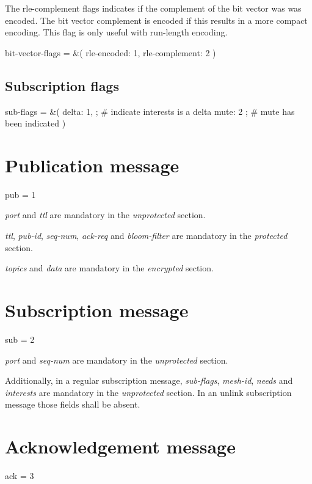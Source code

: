 The rle-\/complement flags indicates if the complement of the bit vector was was encoded. The bit vector complement is encoded if this results in a more compact encoding. This flag is only useful with run-\/length encoding.

\begin{DoxyVerb}bit-vector-flags = &(
  rle-encoded: 1,
  rle-complement: 2
)
\end{DoxyVerb}
\hypertarget{message-types-and-flow_subscription-flags}{}\subsection{Subscription flags}\label{message-types-and-flow_subscription-flags}
\begin{DoxyVerb}sub-flags = &(
  delta: 1,        ; # indicate interests is a delta
  mute: 2          ; # mute has been indicated
)
\end{DoxyVerb}
\hypertarget{message-types-and-flow_publication-message}{}\section{Publication message}\label{message-types-and-flow_publication-message}
\begin{DoxyVerb}pub = 1
\end{DoxyVerb}


{\itshape port} and {\itshape ttl} are mandatory in the {\itshape unprotected} section.

{\itshape ttl}, {\itshape pub-\/id}, {\itshape seq-\/num}, {\itshape ack-\/req} and {\itshape bloom-\/filter} are mandatory in the {\itshape protected} section.

{\itshape topics} and {\itshape data} are mandatory in the {\itshape encrypted} section.\hypertarget{message-types-and-flow_subscription-message}{}\section{Subscription message}\label{message-types-and-flow_subscription-message}
\begin{DoxyVerb}sub = 2
\end{DoxyVerb}


{\itshape port} and {\itshape seq-\/num} are mandatory in the {\itshape unprotected} section.

Additionally, in a regular subscription message, {\itshape sub-\/flags}, {\itshape mesh-\/id}, {\itshape needs} and {\itshape interests} are mandatory in the {\itshape unprotected} section. In an unlink subscription message those fields shall be absent.\hypertarget{message-types-and-flow_acknowledgement-message}{}\section{Acknowledgement message}\label{message-types-and-flow_acknowledgement-message}
\begin{DoxyVerb}ack = 3
\end{DoxyVerb}


